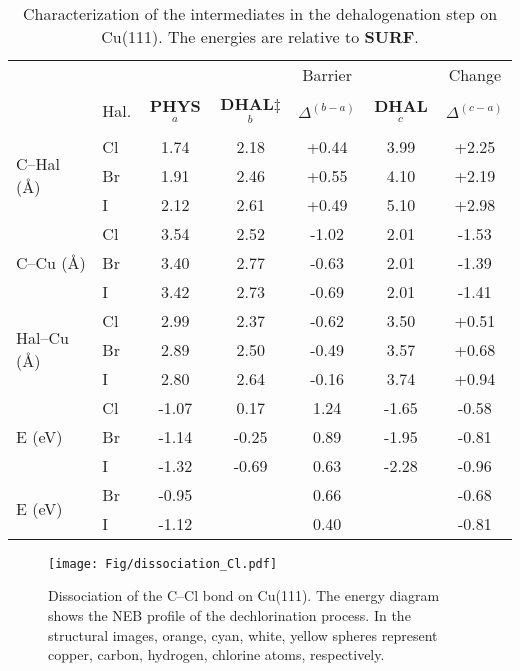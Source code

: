 \documentclass[aps,prl,reprint,amsmath,amssymb,floatfix,notitlepage]{revtex4-1}
\begin{document}
\begin{table*}
\centering
\caption{Characterization of the intermediates in the dehalogenation step on Cu(111). The energies are relative to \textbf{SURF}.
}
\label{table:bondlength}
\begin{tabular}{ llccccc  }
 \hline
 \hline
  & & & & Barrier & & Change \\
  & Hal. & \textbf{PHYS}$^{a}$ & \textbf{DHAL$\ddagger$}$^{b}$ & $\Delta^{(b-a)}$ & \textbf{DHAL}$^{c}$ & $\Delta^{(c-a)}$ \\ 
 \hline 
 \multirow{3}{*}{C--Hal (\si{\angstrom})} & Cl & 1.74 & 2.18 & +0.44 & 3.99 & +2.25 \\ 
 & Br & 1.91 & 2.46 & +0.55 & 4.10 &+2.19 \\ 
 & I & 2.12 & 2.61 & +0.49 & 5.10 &+2.98 \\ 
 \hline
 \multirow{3}{*}{C--Cu (\si{\angstrom}) } & Cl & 3.54 & 2.52 & -1.02 & 2.01 & -1.53 \\ 
 & Br & 3.40 & 2.77 & -0.63 & 2.01 & -1.39 \\ 
 & I &3.42 & 2.73 &-0.69 & 2.01 & -1.41 \\ 
 \hline
 \multirow{3}{*}{Hal--Cu (\si{\angstrom}) } & Cl & 2.99 & 2.37 & -0.62 & 3.50 & +0.51 \\ 
 & Br & 2.89 & 2.50 & -0.49 & 3.57 & +0.68 \\ 
 & I &2.80 & 2.64 &-0.16 & 3.74 & +0.94 \\ 
 \hline
 \multirow{3}{*}{E (\si{\electronvolt}) } & Cl & -1.07 & 0.17 & 1.24 &-1.65 & -0.58 \\ 
 & Br &-1.14 &-0.25 & 0.89 & -1.95& -0.81 \\ 
 & I  & -1.32 & -0.69 & 0.63 & -2.28& -0.96 \\ 
 \hline
 \multirow{2}{*}{E (\si{\electronvolt})~\cite{jacs2013}} & Br &-0.95 & & 0.66 & & -0.68 \\ 
 & I & -1.12 & & 0.40 & & -0.81 \\ 
 \hline
 \hline
\end{tabular}
\end{table*}

\begin{figure*}[hbt]
\centering
\texttt{[image: Fig/dissociation\_Cl.pdf]}
\caption{Dissociation of the C--Cl bond on Cu(111). The energy diagram shows the NEB profile of the dechlorination process. In the structural images, orange, cyan, white, yellow spheres represent copper, carbon, hydrogen, chlorine atoms, respectively.}
\label{fig:dissociation_Cl}
\end{figure*}
\end{document}

